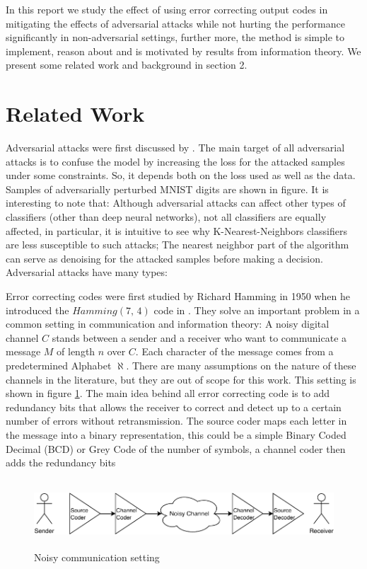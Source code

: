 \documentclass{article}
\begin{document}
In this report we study the effect of using error correcting output codes in mitigating the effects of adversarial attacks while not hurting the performance significantly in non-adversarial settings, further more, the method is simple to implement, reason about and is motivated by results from information theory. We present some related work and background in section 2. 

\newpage


\section{Related Work}
Adversarial attacks were first discussed by . The main target of all adversarial attacks is to confuse the model by increasing the loss for the attacked samples under some constraints. So, it depends both on the loss used as well as the data. Samples of adversarially perturbed MNIST digits are shown in figure. It is interesting to note that: Although adversarial attacks can affect other types of classifiers (other than deep neural networks), not all classifiers are equally affected, in particular, it is intuitive to see why K-Nearest-Neighbors classifiers are less susceptible to such attacks; The nearest neighbor part of the algorithm can serve as denoising for the attacked samples before making a decision. Adversarial attacks have many types: 

Error correcting codes were first studied by Richard Hamming in 1950 when he introduced the $Hamming(7,\, 4)$ code in \cite{hamming1950error}. They solve an important problem in a common setting in communication and information theory: A noisy digital channel $C$ stands between a sender and a receiver who want to communicate a message $M$ of length $n$ over $C$. Each character of the message comes from a predetermined Alphabet $\aleph$. There are many assumptions on the nature of these channels in the literature, but they are out of scope for this work. This setting is shown in figure  \ref{fig:comm}. The main idea behind all error correcting code is to add redundancy bits that allows the receiver to correct and detect up to a certain number of errors without retransmission. The source coder maps each letter in the message into a binary representation, this could be a simple Binary Coded Decimal (BCD) or Grey Code of the number of symbols, a channel coder then adds the redundancy bits  

\begin{figure}[htb]
	\begin{center}
		\includegraphics[height=1in,width=5.5in]{images/comm.pdf}
		\caption{Noisy communication setting} \label{fig:comm} 
	\end{center}
\end{figure}
\end{document}
